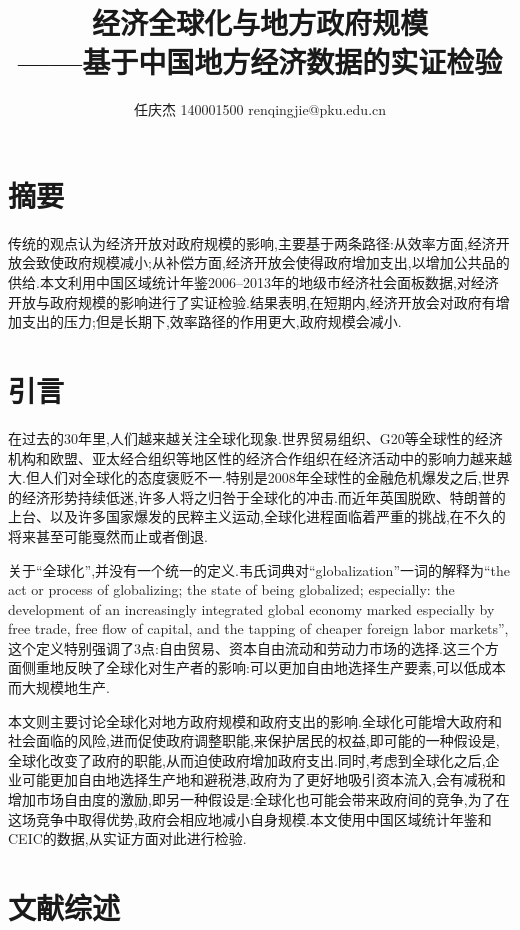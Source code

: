 \documentclass[10pt]{article}
\author{任庆杰  140001500  renqingjie@pku.edu.cn}
\title{经济全球化与地方政府规模\\
——基于中国地方经济数据的实证检验}
\begin{document}
\maketitle{}
\section*{摘要}
传统的观点认为经济开放对政府规模的影响,主要基于两条路径:从效率方面,经济开放会致使政府规模减小;从补偿方面,经济开放会使得政府增加支出,以增加公共品的供给.本文利用中国区域统计年鉴2006--2013年的地级市经济社会面板数据,对经济开放与政府规模的影响进行了实证检验.结果表明,在短期内,经济开放会对政府有增加支出的压力;但是长期下,效率路径的作用更大,政府规模会减小.
\section{引言}
在过去的30年里,人们越来越关注全球化现象.世界贸易组织、G20等全球性的经济机构和欧盟、亚太经合组织等地区性的经济合作组织在经济活动中的影响力越来越大.但人们对全球化的态度褒贬不一.特别是2008年全球性的金融危机爆发之后,世界的经济形势持续低迷,许多人将之归咎于全球化的冲击.而近年英国脱欧、特朗普的上台、以及许多国家爆发的民粹主义运动,全球化进程面临着严重的挑战,在不久的将来甚至可能戛然而止或者倒退.

关于“全球化”,并没有一个统一的定义.韦氏词典对“globalization”一词的解释为“the act or process of globalizing; the state of being globalized; especially: the development of an increasingly integrated global economy marked especially by free trade, free flow of capital, and the tapping of cheaper foreign labor markets”,这个定义特别强调了3点:自由贸易、资本自由流动和劳动力市场的选择.这三个方面侧重地反映了全球化对生产者的影响:可以更加自由地选择生产要素,可以低成本而大规模地生产.

本文则主要讨论全球化对地方政府规模和政府支出的影响.全球化可能增大政府和社会面临的风险,进而促使政府调整职能,来保护居民的权益,即可能的一种假设是,全球化改变了政府的职能,从而迫使政府增加政府支出.同时,考虑到全球化之后,企业可能更加自由地选择生产地和避税港,政府为了更好地吸引资本流入,会有减税和增加市场自由度的激励,即另一种假设是:全球化也可能会带来政府间的竞争,为了在这场竞争中取得优势,政府会相应地减小自身规模.本文使用中国区域统计年鉴和CEIC的数据,从实证方面对此进行检验.

\section{文献综述}
\end{document}
